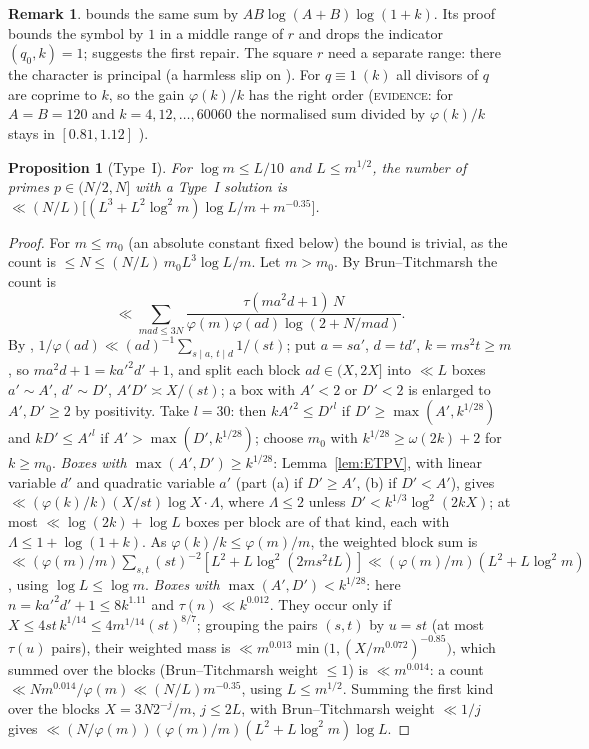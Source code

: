 \documentclass[10pt,reqno]{amsart}
\newtheorem{proposition}[theorem]{Proposition}
\theoremstyle{definition}
\newtheorem{remark}[theorem]{Remark}
\newcommand{\status}[1]{\textup{\textsc{#1}}}
\begin{document}
\begin{remark}
\cite[Prop.~1.4]{ET} bounds the same sum by $AB\log(A+B)\log(1+k)$.  Its
proof bounds the symbol by $1$ in a middle range of $r$ and drops the
indicator $(q_0,k)=1$; \cite[Rem.~1.5]{ET} suggests the first repair.
The square $r$ need a separate range: there the character is principal
(a harmless slip on \cite[p.~31]{ET}).  For $q\equiv1\ (k)$ all
divisors of $q$ are coprime to $k$, so the gain $\varphi(k)/k$ has the
right order (\status{evidence}: for $A=B=120$ and
$k=4,12,\ldots,60060$ the normalised sum divided by $\varphi(k)/k$ stays in
$[0.81,1.12]$ \cite{MN3}).
\end{remark}

\begin{proposition}[Type~I]\label{prop:typeI}
For $\log m\leq L/10$ and $L\leq m^{1/2}$, the number of primes
$p\in(N/2,N]$ with a Type~I solution is
$\ll(N/L)\bigl[(L^3+L^2\log^2m)\log L/m+m^{-0.35}\bigr]$.
\end{proposition}

\begin{proof}
For $m\leq m_0$ (an absolute constant fixed below) the bound is trivial,
as the count is $\leq N\leq(N/L)\,m_0L^3\log L/m$.  Let $m>m_0$.  By
Brun--Titchmarsh the count is \cite[(3.2)]{PW}
\[
 \ll\sum_{mad\leq3N}\frac{\tau(ma^2d+1)\,N}{\varphi(m)\varphi(ad)\log(2+N/mad)}.
\]
By \cite[(A.12)]{ET},
$1/\varphi(ad)\ll(ad)^{-1}\sum_{s\mid a,\,t\mid d}1/(st)$; put $a=sa'$,
$d=td'$, $k=ms^2t\geq m$, so $ma^2d+1=ka'^2d'+1$, and split each block
$ad\in(X,2X]$ into $\ll L$ boxes $a'\sim A'$, $d'\sim D'$,
$A'D'\asymp X/(st)$; a box with $A'<2$ or $D'<2$ is enlarged to
$A',D'\geq2$ by positivity.  Take $l=30$: then $kA'^2\leq D'^l$ if
$D'\geq\max(A',k^{1/28})$ and $kD'\leq A'^l$ if $A'>\max(D',k^{1/28})$;
choose $m_0$ with $k^{1/28}\geq\omega(2k)+2$ for $k\geq m_0$.
\emph{Boxes with $\max(A',D')\geq k^{1/28}$}: Lemma~\ref{lem:ETPV}, with
linear variable $d'$ and quadratic variable $a'$ (part (a) if $D'\geq A'$,
(b) if $D'<A'$), gives $\ll(\varphi(k)/k)(X/st)\log X\cdot\Lambda$, where
$\Lambda\leq2$ unless $D'<k^{1/3}\log^2(2kX)$; at most
$\ll\log(2k)+\log L$ boxes per block are of that kind, each with
$\Lambda\leq1+\log(1+k)$.  As $\varphi(k)/k\leq\varphi(m)/m$, the weighted
block sum is
$\ll(\varphi(m)/m)\sum_{s,t}(st)^{-2}[L^2+L\log^2(2ms^2tL)]
\ll(\varphi(m)/m)(L^2+L\log^2m)$, using $\log L\leq\log m$.
\emph{Boxes with $\max(A',D')<k^{1/28}$}: here $n=ka'^2d'+1\leq8k^{1.11}$
and $\tau(n)\ll k^{0.012}$.  They occur only if
$X\leq4st\,k^{1/14}\leq4m^{1/14}(st)^{8/7}$; grouping the pairs $(s,t)$
by $u=st$ (at most $\tau(u)$ pairs), their weighted mass is
$\ll m^{0.013}\min\bigl(1,(X/m^{0.072})^{-0.85}\bigr)$, which summed over
the blocks (Brun--Titchmarsh weight $\leq1$) is $\ll m^{0.014}$: a count
$\ll Nm^{0.014}/\varphi(m)\ll(N/L)m^{-0.35}$, using $L\leq m^{1/2}$.
Summing the first kind over the blocks $X=3N2^{-j}/m$, $j\leq2L$, with
Brun--Titchmarsh weight $\ll1/j$ gives
$\ll(N/\varphi(m))(\varphi(m)/m)(L^2+L\log^2m)\log L$.
\end{proof}
\end{document}
